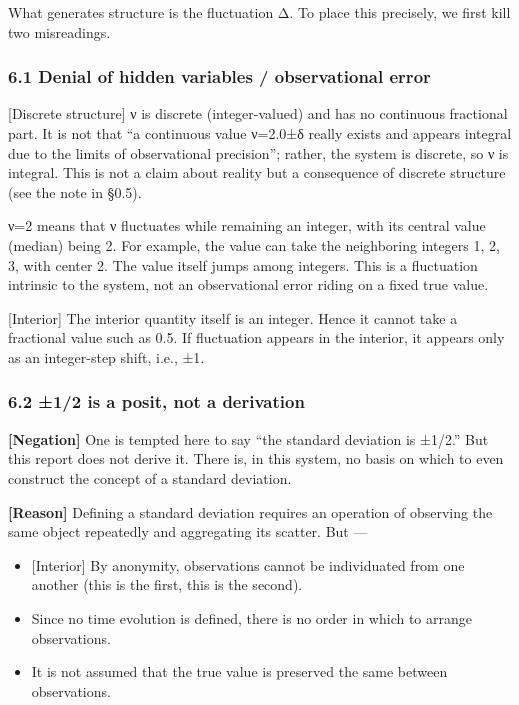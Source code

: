 \documentclass[11pt]{ltjsarticle}
\providecommand{\tightlist}{\setlength{\itemsep}{0pt}\setlength{\parskip}{0pt}}
\begin{document}
What generates structure is the fluctuation Δ. To place this precisely,
we first kill two misreadings.

\subsubsection{6.1 Denial of hidden variables / observational
error}\label{denial-of-hidden-variables-observational-error}

{[}Discrete structure{]} ν is discrete (integer-valued) and has no
continuous fractional part. It is not that ``a continuous value ν=2.0±δ
really exists and appears integral due to the limits of observational
precision''; rather, the system is discrete, so ν is integral. This is
not a claim about reality but a consequence of discrete structure (see
the note in §0.5).

ν=2 means that ν fluctuates while remaining an integer, with its central
value (median) being 2. For example, the value can take the neighboring
integers 1, 2, 3, with center 2. The value itself jumps among integers.
This is a fluctuation intrinsic to the system, not an observational
error riding on a fixed true value.

{[}Interior{]} The interior quantity itself is an integer. Hence it
cannot take a fractional value such as 0.5. If fluctuation appears in
the interior, it appears only as an integer-step shift, i.e., ±1.

\subsubsection{6.2 ±1/2 is a posit, not a
derivation}\label{is-a-posit-not-a-derivation}

\textbf{{[}Negation{]}} One is tempted here to say ``the standard
deviation is ±1/2.'' But this report does not derive it. There is, in
this system, no basis on which to even construct the concept of a
standard deviation.

\textbf{{[}Reason{]}} Defining a standard deviation requires an
operation of observing the same object repeatedly and aggregating its
scatter. But ---

\begin{itemize}
\tightlist
\item
  {[}Interior{]} By anonymity, observations cannot be individuated from
  one another (this is the first, this is the second).
\item
  Since no time evolution is defined, there is no order in which to
  arrange observations.
\item
  It is not assumed that the true value is preserved the same between
  observations.
\end{itemize}
\end{document}
